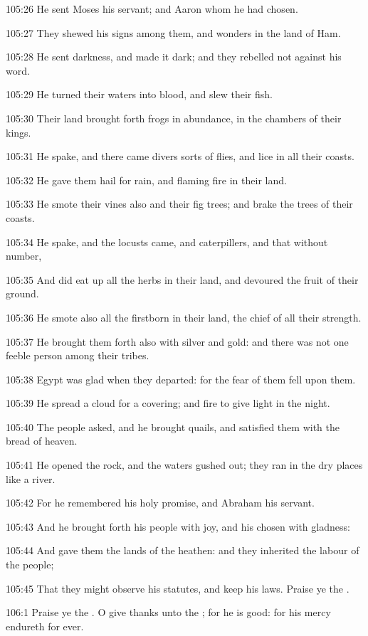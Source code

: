 105:26 He sent Moses his servant; and Aaron whom he had chosen.

105:27 They shewed his signs among them, and wonders in the land of Ham.

105:28 He sent darkness, and made it dark; and they rebelled not against his word.

105:29 He turned their waters into blood, and slew their fish.

105:30 Their land brought forth frogs in abundance, in the chambers of their kings.

105:31 He spake, and there came divers sorts of flies, and lice in all their coasts.

105:32 He gave them hail for rain, and flaming fire in their land.

105:33 He smote their vines also and their fig trees; and brake the trees of their coasts.

105:34 He spake, and the locusts came, and caterpillers, and that without number,

105:35 And did eat up all the herbs in their land, and devoured the fruit of their ground.

105:36 He smote also all the firstborn in their land, the chief of all their strength.

105:37 He brought them forth also with silver and gold: and there was not one feeble person among their tribes.

105:38 Egypt was glad when they departed: for the fear of them fell upon them.

105:39 He spread a cloud for a covering; and fire to give light in the night.

105:40 The people asked, and he brought quails, and satisfied them with the bread of heaven.

105:41 He opened the rock, and the waters gushed out; they ran in the dry places like a river.

105:42 For he remembered his holy promise, and Abraham his servant.

105:43 And he brought forth his people with joy, and his chosen with gladness:

105:44 And gave them the lands of the heathen: and they inherited the labour of the people;

105:45 That they might observe his statutes, and keep his laws. Praise ye the \LORD.



106:1 Praise ye the \LORD. O give thanks unto the \LORD; for he is good: for his mercy endureth for ever.

